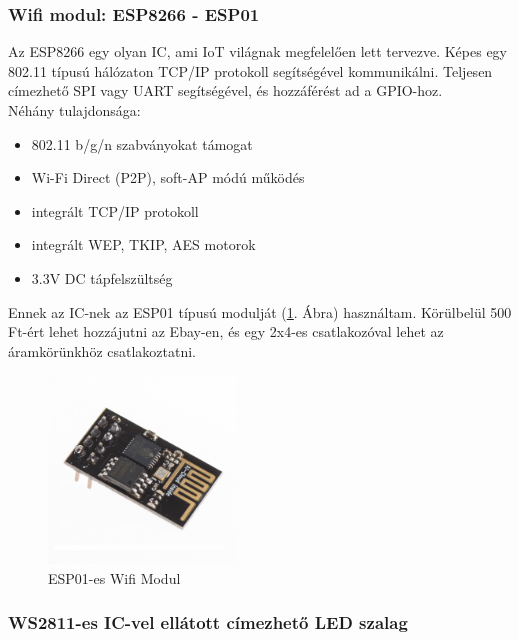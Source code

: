 \documentclass[../main.tex]{subfiles}
\begin{document}
        \subsubsection{Wifi modul: ESP8266 - ESP01} 
            Az ESP8266 egy olyan IC, ami IoT világnak megfelelően lett tervezve. Képes egy 802.11 típusú hálózaton TCP/IP protokoll segítségével kommunikálni. Teljesen címezhető SPI vagy UART segítségével, és hozzáférést ad a GPIO-hoz.\cite{sec_201} \\[12px]
            Néhány tulajdonsága:
            \begin{itemize}
                \item 802.11 b/g/n szabványokat támogat
                \item Wi-Fi Direct (P2P), soft-AP módú működés
                \item integrált TCP/IP protokoll
                \item integrált WEP, TKIP, AES motorok
                \item 3.3V DC tápfelszültség
            \end{itemize}
            
            Ennek az IC-nek az ESP01 típusú modulját (\ref{fig:esp01}. Ábra) használtam. Körülbelül 500 Ft-ért lehet hozzájutni az Ebay-en, és egy 2x4-es csatlakozóval lehet az áramkörünkhöz csatlakoztatni.
            
            \begin{figure}[h!]
                \centering
                    \includegraphics[width=5cm]{resources/pcb_res/esp01.jpg}
                \caption{ESP01-es Wifi Modul\cite{sec_201}}
                \label{fig:esp01}
            \end{figure}
        
        \subsubsection{WS2811-es IC-vel ellátott címezhető LED szalag}
            
\end{document}
